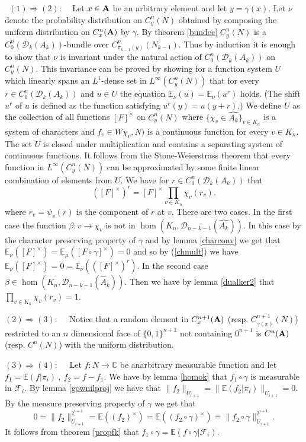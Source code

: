 \documentclass [11pt] {article}
\def\bA{{\bf A}}
\begin{document}
\noindent~$(1)\Rightarrow (2)$:~~
Let $x\in\bA$ be an arbitrary element and let $y=\gamma(x)$.
Let $\nu$ denote the probability distribution on $C_y^n(N)$ obtained by composing the uniform distribution on $C_x^n(\bA)$ by $\gamma$. By theorem \ref{bundec} $C_y^n(N)$ is a $C^n_0(\mathcal{D}_k(A_k))$-bundle over $C^n_{\pi_{k-1}(y)}(N_{k-1})$. Thus by induction it is enough to show that $\nu$ is invariant under the natural action of $C_0^n(\mathcal{D}_k(A_k))$ on $C_y^n(N)$.
This invariance can be proved by showing for a function system $U$ which linearly spans an $L^1$-dense set in $L^\infty(C_y^n(N))$ that for every $r\in C_0^n(\mathcal{D}_k(A_k))$ and $u\in U$ the equation $\mathbb{E}_\nu(u)=\mathbb{E}_\nu(u^r)$ holds. (The shift $u^r$ of $u$ is defined as the function satisfying $u^r(y)=u(y+r)$.)
We define $U$ as the collection of all functions $[F]^\times$ 
on $C_y^n(N)$ where $\{\chi_v\in\hat{A_k}\}_{v\in K_n}$ is a system of characters and $f_v\in W{\chi_v,N)}$ is a continuous function for every $v\in K_n$.
The set $U$ is closed under multiplication and contains a separating system of continuous functions. It follows from the Stone-Weierstrass theorem that every function in $L^\infty(C_y^n(N))$ can be approximated by some finite linear combination of elements from $U$.
We have for $r\in C_0^n(\mathcal{D}_k(A_k))$ that   
\begin{equation}\label{chmult}
([F]^\times)^r=[F]^\times\prod_{v\in K_n}\chi_v(r_v).
\end{equation}
where $r_v=\psi_v(r)$ is the component of $r$ at $v$.
There are two cases.
In the first case the function $\beta: v\rightarrow \chi_v$ is not in  $\hom(K_n,\mathcal{D}_{n-k-1}(\hat{A_k}))$. In this case by the character preserving property of $\gamma$ and by lemma \ref{charconv} we get that $\mathbb{E}_\nu([F]^\times)=\mathbb{E}_\mu([F\circ\gamma]^\times)=0$ and so by (\ref{chmult}) we have $\mathbb{E}_\nu([F]^\times)=0=\mathbb{E}_\nu(([F]^\times)^r)$.
In the second case $\beta\in\hom(K_n,\mathcal{D}_{n-k-1}(\hat{A}_k))$. Then we have by lemma \ref{dualker2} that $\prod_{v\in K_n}\chi_v(r_v)=1$.
\bigskip

\noindent$(2)\Rightarrow(3):$~~ Notice that a random element in $C_x^{n+1}(\bA)$ (resp. $C_{\gamma(x)}^{n+1}(N)$) restricted to an $n$ dimensional face of $\{0,1\}^{n+1}$ not containing $0^{n+1}$ is $C^n(\bA)$ (resp. $C^n(N)$) with the uniform distribution. 

\bigskip

\noindent$(3)\Rightarrow(4):$~~ Let $f:N\rightarrow\mathbb{C}$ be anarbitrary measurable function and let $f_1=\mathbb{E}(f|\pi_i)~,~f_2=f-f_1$. We have by lemma \ref{homok} that $f_1\circ\gamma$ is measurable in $\mathcal{F}_i$. By lemma \ref{gownilproj} we have that $\|f_2\|_{U_{i+1}}=\|\mathbb{E}(f_2|\pi_i)\|_{U_{i+1}}=0$. By the measure preserving property of $\gamma$ we get that $$0=\|f_2\|_{U_{i+1}}^{2^{i+1}}=\mathbb{E}((f_2)^\times)=\mathbb{E}((f_2\circ\gamma)^\times)=\|f_2\circ\gamma\|_{U_{i+1}}^{2^{i+1}}.$$ It follows from theorem \ref{propfk} that $f_1\circ\gamma=\mathbb{E}(f\circ\gamma|\mathcal{F}_i)$.
\end{document}
